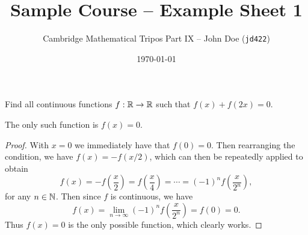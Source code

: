 \documentclass[a4paper]{scrartcl}
\title{Sample Course -- Example Sheet 1}
\author{Cambridge Mathematical Tripos Part IX -- John Doe (\texttt{jd422})}
\date{\today}
\begin{document}
\maketitle

\begin{problem}
  Find all continuous functions $f: \mathbb{R} \rightarrow \mathbb{R}$ such that $f(x) + f(2x) = 0$.
\end{problem}

\begin{claim}
The only such function is $f(x) = 0$.
\end{claim}
\begin{proof}
With $x = 0$ we immediately have that $f(0) = 0$. Then rearranging the condition, we have $
f(x) = - f(x/2)$,
which can then be repeatedly applied to obtain
  $$
  f(x) = - f\left(\frac{x}{2}\right) = f\left(\frac{x}{4}\right) = \cdots = (-1)^n f\left(\frac{x}{2^n}\right),
  $$
  for any $n \in \mathbb{N}$.
  Then since $f$ is continuous, we have
  $$
f(x) = \lim_{n \to \infty} (-1)^n f \left(\frac{x}{2^n}\right) = f(0) = 0.
  $$
  Thus $f(x) = 0$ is the only possible function, which clearly works.
\end{proof}

\end{document}
